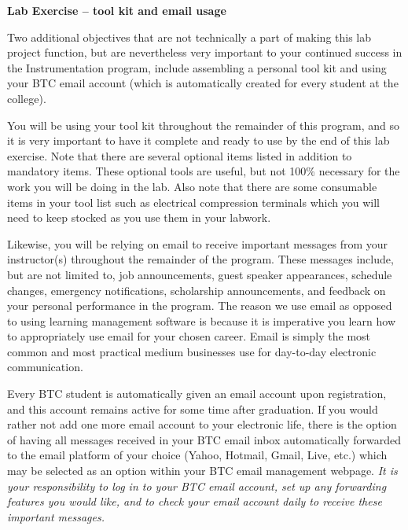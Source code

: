 \vfil \eject

\noindent
{\bf Lab Exercise -- tool kit and email usage}

\vskip 5pt

Two additional objectives that are not technically a part of making this lab project function, but are nevertheless very important to your continued success in the Instrumentation program, include assembling a personal tool kit and using your BTC email account (which is automatically created for every student at the college).  

\vskip 10pt

You will be using your tool kit throughout the remainder of this program, and so it is very important to have it complete and ready to use by the end of this lab exercise.  Note that there are several optional items listed in addition to mandatory items.  These optional tools are useful, but not 100\% necessary for the work you will be doing in the lab.  Also note that there are some consumable items in your tool list such as electrical compression terminals which you will need to keep stocked as you use them in your labwork.

\vskip 10pt

Likewise, you will be relying on email to receive important messages from your instructor(s) throughout the remainder of the program.  These messages include, but are not limited to, job announcements, guest speaker appearances, schedule changes, emergency notifications, scholarship announcements, and feedback on your personal performance in the program.  The reason we use email as opposed to using learning management software is because it is imperative you learn how to appropriately use email for your chosen career.  Email is simply the most common and most practical medium businesses use for day-to-day electronic communication.  

Every BTC student is automatically given an email account upon registration, and this account remains active for some time after graduation.  If you would rather not add one more email account to your electronic life, there is the option of having all messages received in your BTC email inbox automatically forwarded to the email platform of your choice (Yahoo, Hotmail, Gmail, Live, etc.) which may be selected as an option within your BTC email management webpage.  {\it It is your responsibility to log in to your BTC email account, set up any forwarding features you would like, and to check your email account daily to receive these important messages.}

